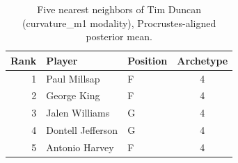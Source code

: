 \begin{table}[htbp]
  \centering\small
  \begin{tabular}{rllc}
    \toprule
    Rank & Player & Position & Archetype \\
    \midrule
    1 & Paul Millsap & F & 4 \\
    2 & George King & F & 4 \\
    3 & Jalen Williams & G & 4 \\
    4 & Dontell Jefferson & G & 4 \\
    5 & Antonio Harvey & F & 4 \\
    \bottomrule
  \end{tabular}
  \caption{Five nearest neighbors of Tim Duncan (curvature_m1 modality), Procrustes-aligned posterior mean.}
  \label{tab:Tim_Duncan_neighbors_curvature_m1}
\end{table}


